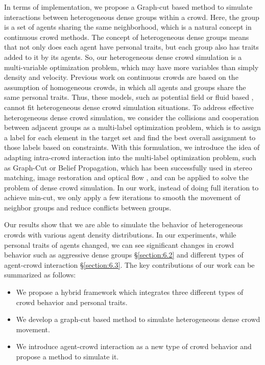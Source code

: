 \documentclass[conference]{acmsiggraph}
\begin{document}
In terms of implementation, we propose a Graph-cut based method to simulate interactions between heterogeneous dense groups within a crowd. Here, the group is a set of agents sharing the same neighborhood, which is a natural concept in continuous crowd methods. The concept of heterogeneous dense groups means that not only does each agent have personal traits, but each group also has traits added to it by its agents. So, our heterogeneous dense crowd simulation is a multi-variable optimization problem, which may have more variables than simply density and velocity. Previous work on continuous crowds are based on the assumption of homogeneous crowds, in which all agents and groups share the same personal traits. Thus, these models, such as potential field \cite{Treuille:2006} or fluid based \cite{Narain:2009}, cannot fit heterogeneous dense crowd simulation situations. To address effective heterogeneous dense crowd simulation, we consider the collisions and cooperation between adjacent groups as a multi-label optimization problem, which is to assign a label for each element in the target set and find the best overall assignment to those labels based on constraints. With this formulation, we introduce the idea of adapting intra-crowd interaction into the multi-label optimization problem, such as Graph-Cut or Belief Propagation, which has been successfully used in stereo matching, image restoration and optical flow \cite{Pedro:2004,Marshall:2003,Qingxiong:2009}, and can be applied to solve the problem of dense crowd simulation. In our work, instead of doing full iteration to achieve min-cut, we only apply a few iterations to smooth the movement of neighbor groups and reduce conflicts between groups.

Our results show that we are able to simulate the behavior of heterogeneous crowds with various agent density distributions. In our experiments, while personal traits of agents changed, we can see significant changes in crowd behavior such as aggressive dense groups \S\ref{section:6.2} and different types of agent-crowd interaction \S\ref{section:6.3}. The key contributions of our work can be summarized as follows:

\begin{itemize}
\item We propose a hybrid framework which integrates three different types of crowd behavior and personal traits.
\item We develop a graph-cut based method to simulate heterogeneous dense crowd movement.
\item We introduce agent-crowd interaction as a new type of crowd behavior and propose a method to simulate it.
\end{itemize}
\end{document}
